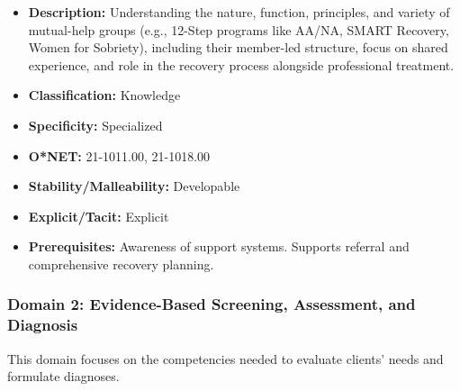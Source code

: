 \documentclass[
  letterpaper,
  DIV=11,
  numbers=noendperiod]{scrartcl}
\providecommand{\tightlist}{%
  \setlength{\itemsep}{0pt}\setlength{\parskip}{0pt}}
\begin{document}
\begin{enumerate}
  \begin{itemize}
  \tightlist
  \item
    \textbf{Description:} Understanding the nature, function,
    principles, and variety of mutual-help groups (e.g., 12-Step
    programs like AA/NA, SMART Recovery, Women for Sobriety), including
    their member-led structure, focus on shared experience, and role in
    the recovery process alongside professional treatment.
  \item
    \textbf{Classification:} Knowledge
  \item
    \textbf{Specificity:} Specialized
  \item
    \textbf{O*NET:} 21-1011.00, 21-1018.00
  \item
    \textbf{Stability/Malleability:} Developable
  \item
    \textbf{Explicit/Tacit:} Explicit
  \item
    \textbf{Prerequisites:} Awareness of support systems. Supports
    referral and comprehensive recovery planning.
  \end{itemize}
\end{enumerate}

\subsubsection{Domain 2: Evidence-Based Screening, Assessment, and
Diagnosis}\label{domain-2-evidence-based-screening-assessment-and-diagnosis}

This domain focuses on the competencies needed to evaluate clients'
needs and formulate diagnoses.
\end{document}
